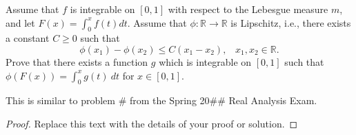 \documentclass{article}
\newenvironment{problem}[2][Problem]{\begin{trivlist}
\item[\hskip \labelsep {\bfseries #1}\hskip \labelsep {\bfseries #2.}]}{\end{trivlist}}
\newenvironment{note}[1][Note.]{\begin{trivlist}
\item[\hskip \labelsep {\bfseries #1}]}{\end{trivlist}}
\begin{document}
\pagebreak

\begin{problem}{4} Assume that $f$ is integrable on $[0, 1]$ with respect to the Lebesgue measure $m$, and let $F(x) = \int_{0}^{x}f(t) dt$. Assume that $\phi: \mathbb{R} \rightarrow \mathbb{R}$ is Lipschitz, i.e., there exists a constant $C \geq 0$ such that \[
	\phi(x_1) - \phi(x_2) \leq C(x_1 - x_2),
    \hspace{10pt} x_1, x_2 \in \mathbb{R}.
\]
Prove that there exists a function $g$ which is integrable on $[0, 1]$ such that $\phi(F(x)) = \int_{0}^{x} g(t) \ dt$ for $x \in [0, 1]$.
\end{problem}

\begin{note} This is similar to problem \# from the Spring 20\#\# Real Analysis Exam.
\end{note}

\begin{proof}
Replace this text with the details of your proof or solution.
\end{proof}
\end{document}
